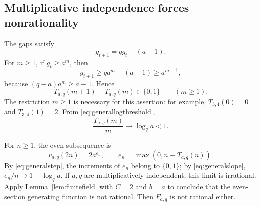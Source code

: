 \documentclass[11pt,letterpaper]{article}
\numberwithin{equation}{section}
\theoremstyle{definition}
\theoremstyle{remark}
\begin{document}
\subsection{Multiplicative independence forces nonrationality}
The gaps satisfy
\begin{equation}\label{eq:gaprec}
 g_{t+1}=qg_t-(a-1).
\end{equation}
For $m\ge1$, if $g_t\ge a^m$, then
\[
 g_{t+1}\ge qa^m-(a-1)\ge a^{m+1},
\]
because $(q-a)a^m\ge a-1$. Hence
\begin{equation}\label{eq:generalstep}
 T_{a,q}(m+1)-T_{a,q}(m)\in\{0,1\}\qquad(m\ge1).
\end{equation}
The restriction $m\ge1$ is necessary for this assertion: for example,
$T_{3,4}(0)=0$ and $T_{3,4}(1)=2$.
From \eqref{eq:generallogthreshold},
\begin{equation}\label{eq:generalslope}
 \frac{T_{a,q}(m)}{m}\longrightarrow\log_q a<1.
\end{equation}

For $n\ge1$, the even subsequence is
\[
 v_{a,q}(2n)=2a^{e_n},\qquad
 e_n=\max(0,n-T_{a,q}(n)).
\]
By \eqref{eq:generalstep}, the increments of $e_n$ belong to $\{0,1\}$;
by \eqref{eq:generalslope}, $e_n/n\to1-\log_q a$.
If $a,q$ are multiplicatively independent, this limit is irrational.
Apply Lemma~\ref{lem:finitefield} with $C=2$ and $b=a$ to conclude that
the even-section generating function is not rational. Then $F_{a,q}$ is
not rational either.
\end{document}
